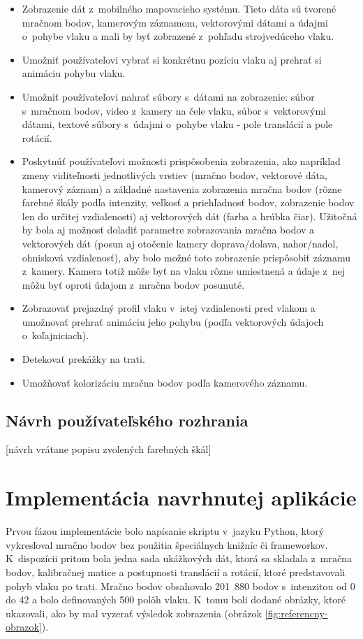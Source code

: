 \begin{itemize}
    \item Zobrazenie dát z~mobilného mapovacieho systému. Tieto dáta sú tvorené mračnom bodov, kamerovým záznamom, vektorovými dátami a údajmi o~pohybe vlaku a mali by byť zobrazené z~pohľadu strojvedúceho vlaku.
    \item Umožniť používateľovi vybrať si konkrétnu pozíciu vlaku aj prehrať si animáciu pohybu vlaku.
    \item Umožniť používateľovi nahrať súbory s~dátami na zobrazenie: súbor s~mračnom bodov, video z~kamery na čele vlaku, súbor s~vektorovými dátami, textové súbory s~údajmi o~pohybe vlaku - pole translácií a pole rotácií.
    \item Poskytnúť používateľovi možnosti prispôsobenia zobrazenia, ako napríklad zmeny viditeľnosti jednotlivých vrstiev (mračno bodov, vektorové dáta, kamerový záznam) a základné nastavenia zobrazenia mračna bodov (rôzne farebné škály podľa intenzity, veľkosť a priehľadnosť bodov, zobrazenie bodov len do určitej vzdialenosti) aj vektorových dát (farba a hrúbka čiar). Užitočná by bola aj možnosť doladiť parametre zobrazovania mračna bodov a vektorových dát (posun aj otočenie kamery doprava/doľava, nahor/nadol, ohnisková vzdialenosť), aby bolo možné toto zobrazenie prispôsobiť záznamu z~kamery. Kamera totiž môže byť na vlaku rôzne umiestnená a údaje z~nej môžu byť oproti údajom z~mračna bodov posunuté.
    \item Zobrazovať prejazdný profil vlaku v~istej vzdialenosti pred vlakom a umožnovať prehrať animáciu jeho pohybu (podľa vektorových údajoch o~koľajniciach).
    \item Detekovať prekážky na trati.
    \item Umožňovať kolorizáciu mračna bodov podľa kamerového záznamu.
\end{itemize}

\section{Návrh používateľského rozhrania}

[návrh vrátane popisu zvolených farebných škál]

\chapter{Implementácia navrhnutej aplikácie}

Prvou fázou implementácie bolo napísanie skriptu v~jazyku Python, ktorý vykresľoval mračno bodov bez použitia špeciálnych knižníc či frameworkov. K~dispozícii pritom bola jedna sada ukážkových dát, ktorá sa skladala z~mračna bodov, kalibračnej matice a postupnosti translácií a rotácií, ktoré predstavovali pohyb vlaku po trati. Mračno bodov obsahovalo 201~880 bodov s~intenzitou od 0 do 42 a bolo definovaných 500 polôh vlaku. K~tomu boli dodané obrázky, ktoré ukazovali, ako by mal vyzerať výsledok zobrazenia (obrázok \ref{fig:referencny-obrazok}).

